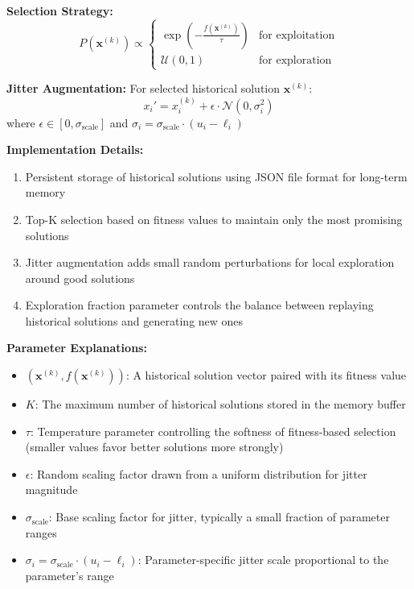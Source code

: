 \documentclass[12pt,a4paper]{article}
\begin{document}
\textbf{Selection Strategy:}
\begin{equation}
P(\bm{x}^{(k)}) \propto \begin{cases}
\exp\left(-\frac{f(\bm{x}^{(k)})}{\tau}\right) & \text{for exploitation} \\
\mathcal{U}(0,1) & \text{for exploration}
\end{cases} \label{eq:memory_selection}
\end{equation}

\textbf{Jitter Augmentation:}
For selected historical solution $\bm{x}^{(k)}$:
\begin{equation}
x_i' = x_i^{(k)} + \epsilon \cdot \mathcal{N}(0, \sigma_i^2) \label{eq:memory_jitter}
\end{equation}
where $\epsilon \in [0, \sigma_{\text{scale}}]$ and $\sigma_i = \sigma_{\text{scale}} \cdot (u_i - \ell_i)$

\textbf{Implementation Details:}
\begin{enumerate}
\item Persistent storage of historical solutions using JSON file format for long-term memory
\item Top-K selection based on fitness values to maintain only the most promising solutions
\item Jitter augmentation adds small random perturbations for local exploration around good solutions
\item Exploration fraction parameter controls the balance between replaying historical solutions and generating new ones
\end{enumerate}

\textbf{Parameter Explanations:}
\begin{itemize}
\item $(\bm{x}^{(k)}, f(\bm{x}^{(k)}))$: A historical solution vector paired with its fitness value
\item $K$: The maximum number of historical solutions stored in the memory buffer
\item $\tau$: Temperature parameter controlling the softness of fitness-based selection (smaller values favor better solutions more strongly)
\item $\epsilon$: Random scaling factor drawn from a uniform distribution for jitter magnitude
\item $\sigma_{\text{scale}}$: Base scaling factor for jitter, typically a small fraction of parameter ranges
\item $\sigma_i = \sigma_{\text{scale}} \cdot (u_i - \ell_i)$: Parameter-specific jitter scale proportional to the parameter's range
\end{itemize}
\end{document}
